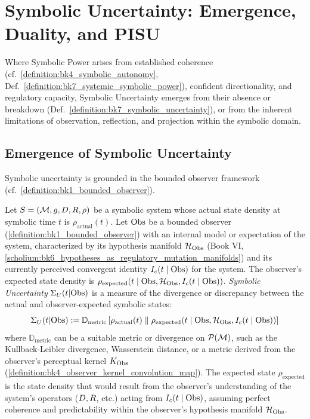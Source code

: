 \section{Symbolic Uncertainty: Emergence, Duality, and PISU}
\label{sec:bk7_symbolic_uncertainty_emergence_duality_pisu}
Where Symbolic Power arises from established coherence (cf.~\ref{definition:bk4_symbolic_autonomy}, Def.~\ref{definition:bk7_systemic_symbolic_power}), confident directionality, and regulatory capacity, Symbolic Uncertainty emerges from their absence or breakdown (Def.~\ref{definition:bk7_symbolic_uncertainty}), or from the inherent limitations of observation, reflection, and projection within the symbolic domain.

\subsection{Emergence of Symbolic Uncertainty}
\label{subsec:bk7_emergence_symbolic_uncertainty}
Symbolic uncertainty is grounded in the bounded observer framework (cf.~\ref{definition:bk1_bounded_observer}).

\begin{definition}
\label{definition:bk7_symbolic_uncertainty}
Let \(S = (\mathcal{M}, g, D, R, \rho)\) be a symbolic system whose actual state density at symbolic time \(t\) is \(\rho_{\text{actual}}(t)\). Let \(\mathrm{Obs}\) be a bounded observer (\ref{definition:bk1_bounded_observer}) with an internal model or expectation of the system, characterized by its hypothesis manifold \(\mathcal{H}_{\mathrm{Obs}}\) (Book VI, \ref{scholium:bk6_hypotheses_as_regulatory_mutation_manifolds}) and its currently perceived convergent identity \(I_c(t \mid \mathrm{Obs})\) for the system. The observer's expected state density is \(\rho_{\text{expected}}(t \mid \mathrm{Obs}, \mathcal{H}_{\mathrm{Obs}}, I_c(t \mid \mathrm{Obs}))\).
\emph{Symbolic Uncertainty} \(\Sigma_U(t|\mathrm{Obs})\) is a measure of the divergence or discrepancy between the actual and observer-expected symbolic states:
\[
\Sigma_U(t|\mathrm{Obs}) := \mathbb{D}_{\text{metric}}\left[\rho_{\text{actual}}(t) \parallel \rho_{\text{expected}}(t \mid \mathrm{Obs}, \mathcal{H}_{\mathrm{Obs}}, I_c(t \mid \mathrm{Obs}))\right]
\]
where \(\mathbb{D}_{\text{metric}}\) can be a suitable metric or divergence on \(\mathcal{P}(\mathcal{M})\), such as the Kullback-Leibler divergence, Wasserstein distance, or a metric derived from the observer's perceptual kernel \(K_{\mathrm{Obs}}\) (\ref{definition:bk4_observer_kernel_convolution_map}).
The expected state \(\rho_{\text{expected}}\) is the state density that would result from the observer's understanding of the system's operators (\(D, R\), etc.) acting from \(I_c(t \mid \mathrm{Obs})\), assuming perfect coherence and predictability within the observer's hypothesis manifold \(\mathcal{H}_{\mathrm{Obs}}\).
\end{definition}

